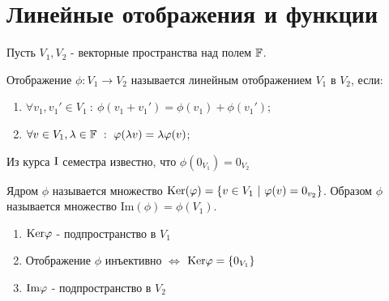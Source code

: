 \section{Линейные отображения и функции}
    Пусть $V_1, V_2$ - векторные пространства над полем $\F$.
    \begin{definition}
        Отображение $\phi: V_1 \rightarrow V_2$ называется линейным отображением $V_1$ в $V_2$, если:
        \begin{enumerate}
            \item $\forall v_1, v_1'\in V_1 \ : \ \phi(v_1 + v_1') = \phi(v_1) + \phi(v_1')$;
            \item $\forall v \in V_1, \lambda \in \F \ : \ \phi(\lambda v) = \lambda\phi(v)$;
        \end{enumerate}
    \end{definition}
        Из курса $\textup{I}$ семестра известно, что $\phi (0_{V_1}) = 0_{V_2}$
    \begin{definition}
        Ядром $\phi$ называется множество $\textup{Ker}(\phi) = \{v \in V_1 \ | \ \phi(v) = 0_{v_2}\}$. Образом $\phi$ называется множество $\text{Im}(\phi) = \phi(V_1)$.
    \end{definition}
    \begin{subtheorem}
    \begin{enumerate} \tab
      \item $\textup{Ker}\phi$ - подпространство в $V_1$
      \item Отображение $\phi$ инъективно $\Longleftrightarrow$ $\textup{Ker}\phi=\{0_{V_1}\}$
      \item $\textup{Im}\phi$ - подпространство в $V_2$
    \end{enumerate}
  \end{subtheorem}

